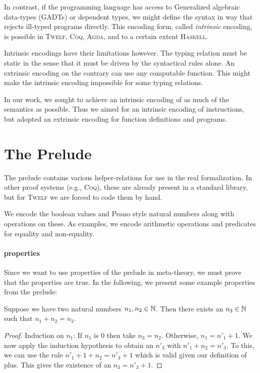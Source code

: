 \documentclass[a4paper, oneside, 10pt, draft]{memoir}
\newcommand{\twelf}{\textsc{Twelf}}
\newcommand{\coq}{\textsc{Coq}}
\newcommand{\agda}{\textsc{Agda}}
\newcommand{\haskell}{\textsc{Haskell}}
\begin{document}
In contrast, if the programming language has access to Generalized
algebraic data-types (GADTs) or dependent types, we might define the
syntax in way that rejects ill-typed programs directly. This encoding
form, called \emph{intrinsic} encoding, is possible in \twelf{},
\coq{}, \agda{}, and to a certain extent \haskell{}.

Intrinsic encodings have their limitations however. The typing
relation must be static in the sense that it must be driven by the
syntactical rules alone. An extrinsic encoding on the contrary can use
any computable function. This might make the
intrinsic encoding impossible for some typing relations.

In our work, we sought to achieve an intrinsic encoding of as much of
the semantics as possible. Thus we aimed for an intrinsic encoding of
instructions, but adopted an extrinsic encoding for function
definitions and programs.

\section{The Prelude}

The prelude contains various helper-relations for use in the real
formalization. In other proof systems (e.g., \coq{}\cite{team:coq*1}),
these are already present in a standard library, but for \twelf{} we
are forced to code them by hand.

We encode the boolean values and Peano style natural numbers along with
operations on these. As examples, we encode arithmetic operations and
predicates for equality and non-equality.

\paragraph{properties}

Since we want to use properties of the prelude in meta-theory, we must
prove that the properties are true. In the following, we present some
example properties from the prelude:
\begin{lem}
  Suppose we have two natural numbers $n_1, n_2 \in \mathbb{N}$. Then there
  exists an $n_3 \in \mathbb{N}$ such that $n_1 + n_2 = n_3$.
\end{lem}
\begin{proof}
  Induction on $n_1$: If $n_1$ is $0$ then take $n_3 =
  n_2$. Otherwise, $n_1 = n'_1 + 1$. We now apply the induction
  hypothesis to obtain an $n'_3$ with $n'_1 + n_2 = n'_3$. To this, we
  can use the rule $n'_1 + 1 + n_2 = n'_3 + 1$ which is valid given
  our definition of plus. This gives the existence of an $n_3 = n'_3 +
  1$.
\end{proof}
\end{document}
